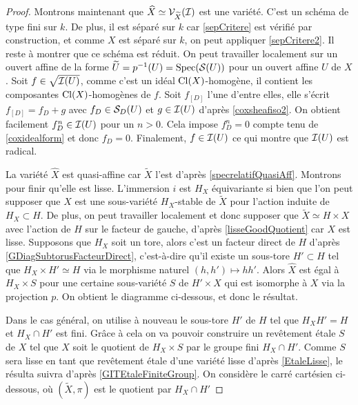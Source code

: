 \begin{proof}
Montrons maintenant que $\widehat{X}\simeq \mathcal{V}_{\widetilde{X}}(\mathcal{I})$ est une variété. C'est un schéma de type fini sur $k$. De plus, il est séparé sur $k$ car \ref{sepCritere} est vérifié par construction, et comme $X$ est séparé sur $k$, on peut appliquer \ref{sepCritere2}. Il reste à montrer que ce schéma est réduit. On peut travailler localement sur un ouvert affine de la forme $\widetilde{U}=p^{-1}(U)=\operatorname{Spec}(\mathcal{S}(U))$ pour un ouvert affine $U$ de $X$. Soit $f\in\sqrt{\mathcal{I}(U)}$, comme c'est un idéal $\operatorname{Cl}(X)$-homogène, il contient les composantes $\operatorname{Cl}(X)$-homogènes de $f$. Soit $f_{[D]}$ l'une d'entre elles, elle s'écrit $f_{[D]}=f_D+g$ avec $f_D\in \mathcal{S}_D(U)$ et $g\in\mathcal{I}(U)$ d'après \ref{coxsheafiso2}. On obtient facilement $f_D^n\in \mathcal{I}(U)$ pour un $n>0$. Cela impose $f_D^n=0$ compte tenu de \ref{coxidealform} et donc $f_D=0$. Finalement, $f\in\mathcal{I}(U)$ ce qui montre que $\mathcal{I}(U)$ est radical.

La variété $\widehat{X}$ est quasi-affine car $\widetilde{X}$ l'est d'après \ref{specrelatifQuasiAff}. Montrons pour finir qu'elle est lisse. L'immersion $i$ est $H_X$ équivariante si bien que l'on peut supposer que  $\widehat{X}$ est une sous-variété $H_X$-stable de $\widetilde{X}$ pour l'action induite de $H_X\subset H$. De plus, on peut travailler localement et donc supposer que $\widetilde{X}\simeq H\times X$ avec l'action de $H$ sur le facteur de gauche, d'après \ref{lisseGoodQuotient} car $X$ est lisse. Supposons que $H_X$ soit un tore, alors c'est un facteur direct de $H$ d'après \ref{GDiagSubtorusFacteurDirect}, c'est-à-dire qu'il existe un sous-tore $H'\subset H$ tel que $ H_X\times H'\simeq H$ via le morphisme naturel $(h,h')\mapsto hh'$. Alors $\widehat{X}$ est égal à $H_X\times S$ pour une certaine sous-variété $S$ de $H'\times X$ qui est isomorphe à $X$ via la projection $p$. On obtient le diagramme ci-dessous, et donc le résultat.

	\begin{center}
	\end{center}

Dans le cas général, on utilise à nouveau le sous-tore $H'$ de $H$ tel que $H_XH'=H$ et $H_X\cap H'$ est fini. Grâce à cela on va pouvoir construire un revêtement étale $S$ de $X$ tel que $\widehat{X}$ soit le quotient de $H_X\times S$ par le groupe fini $H_X\cap H'$. Comme $S$ sera lisse en tant que revêtement étale d'une variété lisse d'après \ref{EtaleLisse}, le résulta suivra d'après \ref{GITEtaleFiniteGroup}. On considère le carré cartésien ci-dessous, où $(\widetilde{X},\pi)$ est le quotient par $H_X\cap H'$


\end{proof}
